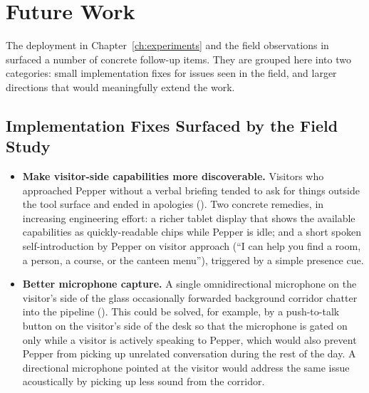 \chapter{Future Work}
\label{ch:future_work}


The deployment in Chapter~\ref{ch:experiments} and the field observations in  surfaced a number of concrete follow-up items.
They are grouped here into two categories: small implementation fixes for issues seen in the field, and larger directions that would meaningfully extend the work.

\section{Implementation Fixes Surfaced by the Field Study}
\label{sec:fw_fixes}

\begin{itemize}
    \item \textbf{Make visitor-side capabilities more discoverable.}
    Visitors who approached Pepper without a verbal briefing tended to ask for things outside the tool surface and ended in apologies ().
    Two concrete remedies, in increasing engineering effort:
    a richer tablet display that shows the available capabilities as quickly-readable chips while Pepper is idle;
    and a short spoken self-introduction by Pepper on visitor approach (``I can help you find a room, a person, a course, or the canteen menu''), triggered by a simple presence cue.

    \item \textbf{Better microphone capture.}
    A single omnidirectional microphone on the visitor's side of the glass occasionally forwarded background corridor chatter into the pipeline ().
    This could be solved, for example, by a push-to-talk button on the visitor's side of the desk so that the microphone is gated on only while a visitor is actively speaking to Pepper, which would also prevent Pepper from picking up unrelated conversation during the rest of the day.
    A directional microphone pointed at the visitor would address the same issue acoustically by picking up less sound from the corridor.
\end{itemize}


